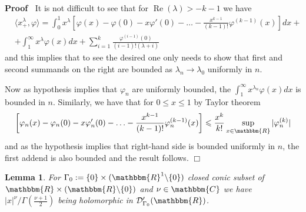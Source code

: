 \documentclass{article}
\newcommand{\assign}{:=}
\newcommand{\tmop}[1]{\ensuremath{\operatorname{#1}}}
\renewenvironment{proof}{\noindent\textbf{Proof\ }}{\hspace*{\fill}$\Box$\medskip}
\newtheorem{lemma}[proposition]{Lemma}
\theoremstyle{remark}
\begin{document}
\begin{proof}
  It is not difficult to see that for $\tmop{Re} (\lambda) > - k - 1$ we have
  \begin{eqnarray}
    & \langle x_+^{\lambda}, \varphi \rangle = \int_0^1 x^{\lambda} \left[
    \varphi (x) - \varphi (0) - x \varphi' (0) - \ldots - \frac{x^{k - 1}}{(k
    - 1) !} \varphi^{(k - 1)} (x) \right] d x + &  \nonumber\\
    & + \int_1^{\infty} x^{\lambda} \varphi (x) d x + \sum_{i = 1}^k
    \frac{\varphi^{(i - 1)} (0)}{(i - 1) ! (\lambda + i)} &  \nonumber
  \end{eqnarray}
  and this implies that to see the desired one only needs to show that first
  and second summands on the right are bounded as $\lambda_n \rightarrow
  \lambda_0$ uniformly in $n$.
  
  Now as hypothesis implies that $\varphi_n$ are uniformly bounded, the
  $\int_1^{\infty} x^{\lambda_n} \varphi (x) d x$ is bounded in $n$.
  Similarly, we have that for $0 \leqslant x \leqslant 1$ by Taylor theorem
  \[ \left[ \varphi_n (x) - \varphi_n (0) - x \varphi'_n (0) - \ldots -
     \frac{x^{k - 1}}{(k - 1) !} \varphi^{(k - 1)}_n (x) \right] \leqslant
     \frac{x^k}{k!} \sup_{x \in \mathbbm{R}} | \varphi_n^{(k)} | \]
  and as the hypothesis implies that right-hand side is bounded uniformly in
  $n$, the first addend is also bounded and the result follows.
\end{proof}

\begin{lemma}
  \label{supp-n-waves:lem-|x|-holo-in}For $\Gamma_0 \assign \{ 0 \} \times
  (\mathbbm{R}^1 \backslash \{ 0 \})$ closed conic subset of $\mathbbm{R}
  \times (\mathbbm{R}\backslash \{ 0 \})$ and $\nu \in \mathbbm{C}$ we have $|
  x |^{\nu} / \Gamma \left( \frac{\nu + 1}{2} \right)$ being holomorphic in
  $\mathcal{D}'_{\Gamma_0} (\mathbbm{R})$.
\end{lemma}
\end{document}
